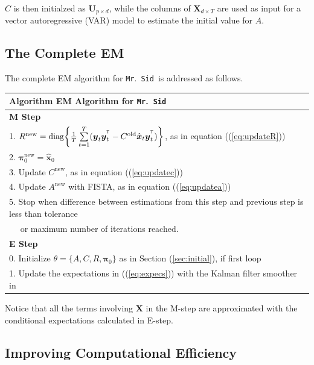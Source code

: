 \documentclass[fleqn]{article}
\let\oldref\ref
\renewcommand{\ref}[1]{(\oldref{#1})}
\newcommand{\T}{^{\ensuremath{\mathsf{T}}}}           %
\newcommand{\mrsid}{{\sc \texttt{Mr}.~\texttt{Sid}}}
\newcommand{\diag}{\operatornamewithlimits{diag}}
\providecommand{\mb}[1]{\boldsymbol{#1}}
\newcommand{\bx}{\mb{x}}
\newcommand{\by}{\mb{y}}
\newcommand{\bX}{\mb{X}}
\begin{document}
$C$ is then initialzed as $\mathbf{U}_{p\times d}$, while the columns of $\bX_{d \times T}$ are used as input for a vector autoregressive (VAR) model to estimate the initial value for $A$.

\subsection{The Complete EM}\label{sec:em}
The complete EM algorithm for \mrsid~is addressed as follows.\\

\begin{tabular}{l}
\hline
\textbf{Algorithm } EM Algorithm for \mrsid\\
\hline
\textbf{M Step}\\
1. $R^{\text{new}}=\diag\biggl\{\frac{1}{T}\sum\limits_{t=1}^{T}(\by_t\by_t^{\T}-C^{\text{old}} \hat{\bx}_t\by_t^{\T})\biggr\}$, as in equation \ref{eq:updateR}\\
2. $\mathbf{\pi}_0^{\text{new}}=\hat{\bx}_0$\\
3. Update $C^{\text{new}}$, as in equation \ref{eq:updatec}\\
4. Update $A^{\text{new}}$ with FISTA, as in equation \ref{eq:updatea}\\
5. Stop when difference between estimations from this step and previous step is less than tolerance\\
  $\quad$ or maximum number of iterations reached.\\
\hline
\textbf{E Step}\\
0. Initialize $\theta =\{A,C,R,\mathbf{\pi}_0\}$ as in Section \oldref{sec:initial}, if first loop\\
1. Update the expectations in \ref{eq:expecs} with the Kalman filter smoother in \nameref{sec:appendix1}\\
\hline
\end{tabular}

Notice that all the terms involving $\bX$ in the M-step are approximated with the conditional expectations calculated in E-step.

\subsection{Improving Computational Efficiency}
\end{document}
